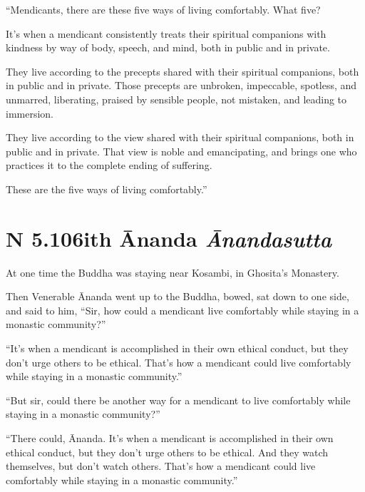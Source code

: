 \documentclass[12pt,openany]{book}%
\newcommand*{\suttatitleacronym}[1]{\smaller[2]{#1}\vspace*{.3em}}
\newcommand*{\suttatitletranslation}[1]{\linebreak{#1}}
\newcommand*{\suttatitleroot}[1]{\linebreak\smaller[2]\itshape{#1}}
\newcommand*{\tocacronym}[1]{\hspace*{-3.3em}{#1}\quad}
\newcommand*{\toctranslation}[1]{#1}
\newcommand*{\tocroot}[1]{(\textit{#1})}
\begin{document}
“Mendicants, there are these five ways of living comfortably. What five? 

It’s when a mendicant consistently treats their spiritual companions with kindness by way of body, speech, and mind, both in public and in private. 

They live according to the precepts shared with their spiritual companions, both in public and in private. Those precepts are unbroken, impeccable, spotless, and unmarred, liberating, praised by sensible people, not mistaken, and leading to immersion. 

They live according to the view shared with their spiritual companions, both in public and in private. That view is noble and emancipating, and brings one who practices it to the complete ending of suffering. 

These are the five ways of living comfortably.” 

%
\section*{{\suttatitleacronym AN 5.106}{\suttatitletranslation With Ānanda }{\suttatitleroot Ānandasutta}}
\addcontentsline{toc}{section}{\tocacronym{AN 5.106} \toctranslation{With Ānanda } \tocroot{Ānandasutta}}

At one time the Buddha was staying near Kosambi, in Ghosita’s Monastery. 

Then Venerable Ānanda went up to the Buddha, bowed, sat down to one side, and said to him, “Sir, how could a mendicant live comfortably while staying in a monastic community?” 

“It’s when a mendicant is accomplished in their own ethical conduct, but they don’t urge others to be ethical. That’s how a mendicant could live comfortably while staying in a monastic community.” 

“But sir, could there be another way for a mendicant to live comfortably while staying in a monastic community?” 

“There could, Ānanda. It’s when a mendicant is accomplished in their own ethical conduct, but they don’t urge others to be ethical. And they watch themselves, but don’t watch others. That’s how a mendicant could live comfortably while staying in a monastic community.” 
\end{document}
